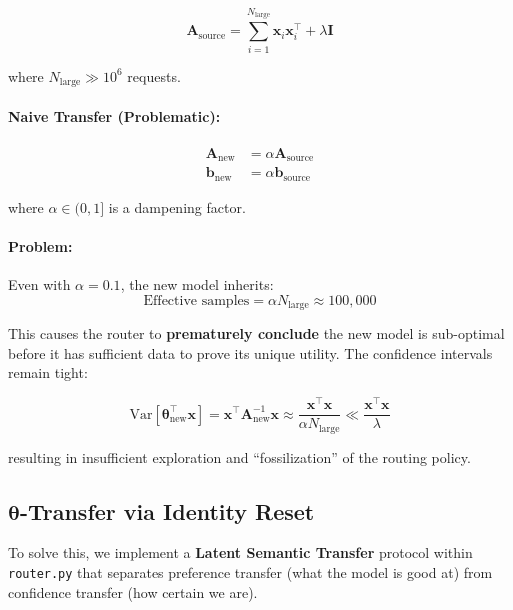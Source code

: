 \documentclass[sigconf]{acmart}
\begin{document}
\begin{equation}
\mathbf{A}_{\text{source}} = \sum_{i=1}^{N_{\text{large}}} \mathbf{x}_i \mathbf{x}_i^\top + \lambda \mathbf{I}
\end{equation}

where $N_{\text{large}} \gg 10^6$ requests.

\paragraph{Naive Transfer (Problematic):}
\begin{align}
\mathbf{A}_{\text{new}} &= \alpha \mathbf{A}_{\text{source}} \label{eq:naive_transfer_A} \\
\mathbf{b}_{\text{new}} &= \alpha \mathbf{b}_{\text{source}} \label{eq:naive_transfer_b}
\end{align}

where $\alpha \in (0, 1]$ is a dampening factor.

\paragraph{Problem:} Even with $\alpha = 0.1$, the new model inherits:
\begin{equation}
\text{Effective samples} = \alpha N_{\text{large}} \approx 100{,}000
\end{equation}

This causes the router to \textbf{prematurely conclude} the new model is sub-optimal before it has sufficient data to prove its unique utility. The confidence intervals remain tight:

\begin{equation}
\text{Var}[\boldsymbol{\theta}_{\text{new}}^\top \mathbf{x}] = \mathbf{x}^\top \mathbf{A}_{\text{new}}^{-1} \mathbf{x} \approx \frac{\mathbf{x}^\top \mathbf{x}}{\alpha N_{\text{large}}} \ll \frac{\mathbf{x}^\top \mathbf{x}}{\lambda}
\end{equation}

resulting in insufficient exploration and ``fossilization'' of the routing policy.

\subsection{$\boldsymbol{\theta}$-Transfer via Identity Reset}

To solve this, we implement a \textbf{Latent Semantic Transfer} protocol within \texttt{router.py} that separates preference transfer (what the model is good at) from confidence transfer (how certain we are).
\end{document}
